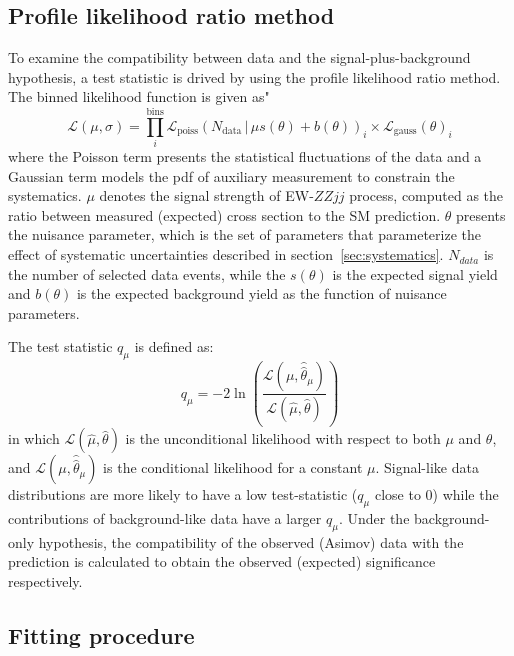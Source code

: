 \subsection{Profile likelihood ratio method}

To examine the compatibility between data and the signal-plus-background hypothesis, 
a test statistic is drived by using the profile likelihood ratio method.
The binned likelihood function is given as"
\begin{equation}
	\mathcal{L}(\mu,\sigma) = \prod_{i}^\mathrm{bins} \mathcal{L}_{\mathrm{poiss}}(N_{\mathrm{data}}\,|\,\mu s(\theta)+b(\theta))_{i} \times \mathcal{L}_{\text{gauss}}(\theta)_{i}
\end{equation}
where the Poisson term presents the statistical fluctuations of the data 
and a Gaussian term models the pdf of auxiliary measurement to constrain the systematics.
$\mu$ denotes the signal strength of EW-$ZZjj$ process, computed as the ratio between measured (expected) cross section to the SM prediction.
$\theta$ presents the nuisance parameter, which is the set of parameters that parameterize the effect of systematic uncertainties described in section~\ref{sec:systematics}.
$N_{data}$ is the number of selected data events, while the $s(\theta)$ is the expected signal yield and $b(\theta)$ is the expected background yield as the function of nuisance parameters.

The test statistic $q_{\mu}$ is defined as:
\begin{equation}
	q_\mu = -2 \ln \left( \dfrac{\mathcal{L}(\mu,\hat{\hat{\theta}}_{\mu})}{\mathcal{L}(\hat{\mu},\hat{\theta})} \right)
\end{equation}
in which $\mathcal{L}(\hat{\mu},\hat{\theta})$ is the unconditional likelihood with respect to both $\mu$ and $\theta$,
and $\mathcal{L}(\mu,\hat{\hat{\theta}}_{\mu})$ is the conditional likelihood for a constant $\mu$.
Signal-like data distributions are more likely to have a low test-statistic ($q_\mu$ close to 0) 
while the contributions of background-like data have a larger $q_\mu$.
Under the background-only hypothesis, the compatibility of the observed (Asimov) data with the prediction 
is calculated to obtain the observed (expected) significance respectively.

\subsection{Fitting procedure}

